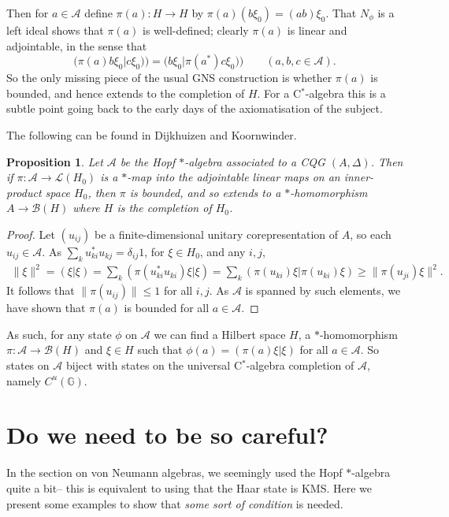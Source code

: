 \documentclass[twoside,a4paper,12pt]{article}
\theoremstyle{plain}
\newtheorem{proposition}{Proposition}[section]
\theoremstyle{definition}
\newcommand{\mc}{\mathcal}
\newcommand{\G}{{\mathbb G}}
\begin{document}
Then for $a\in\mc A$ define $\pi(a):H\rightarrow H$ by $\pi(a)(b\xi_0)
=(ab)\xi_0$.  That $N_\phi$ is a left ideal shows that $\pi(a)$ is
well-defined; clearly $\pi(a)$ is linear and adjointable, in the sense
that
\[ \big( \pi(a) b\xi_0 \big| c\xi_0) \big)
= \big( b\xi_0 \big| \pi(a^*) c\xi_0) \big)
\qquad (a,b,c\in\mc A). \]
So the only missing piece of the usual GNS construction is whether $\pi(a)$
is bounded, and hence extends to the completion of $H$.  For a C$^*$-algebra
this is a subtle point going back to the early days of the axiomatisation of
the subject.

The following can be found in Dijkhuizen and Koornwinder.

\begin{proposition}
Let $\mc A$ be the Hopf $*$-algebra associated to a CQG $(A,\Delta)$.
Then if $\pi:\mc A\rightarrow\mc L(H_0)$ is a $*$-map into the adjointable
linear maps on an inner-product space $H_0$, then $\pi$ is bounded, and
so extends to a $*$-homomorphism $A\rightarrow\mc B(H)$ where $H$ is the
completion of $H_0$.
\end{proposition}
\begin{proof}
Let $(u_{ij})$ be a finite-dimensional unitary corepresentation of $A$,
so each $u_{ij}\in\mc A$.  As $\sum_k u_{ki}^* u_{kj} = \delta_{ij}1$,
for $\xi\in H_0$, and any $i,j$,
\begin{align*} \|\xi\|^2 = (\xi|\xi) = \sum_{k} (\pi(u_{ki}^*u_{ki})\xi|\xi)
= \sum_k (\pi(u_{ki})\xi|\pi(u_{ki})\xi)
\geq \| \pi(u_{ji})\xi \|^2. \end{align*}
It follows that $\|\pi(u_{ij})\|\leq 1$ for all $i,j$.  As $\mc A$ is spanned
by such elements, we have shown that $\pi(a)$ is bounded for all $a\in\mc A$.
\end{proof}

As such, for any state $\phi$ on $\mc A$ we can find a Hilbert space $H$,
a $*$-homomorphism $\pi:\mc A\rightarrow\mc B(H)$ and $\xi\in H$ such that
$\phi(a) = (\pi(a)\xi|\xi)$ for all $a\in\mc A$.  So states on $\mc A$ biject
with states on the universal C$^*$-algebra completion of $\mc A$, namely
$C^u(\G)$.




\section{Do we need to be so careful?}

In the section on von Neumann algebras, we seemingly used the Hopf $*$-algebra
quite a bit-- this is equivalent to using that the Haar state is KMS.  Here
we present some examples to show that \emph{some sort of condition} is needed.
\end{document}
